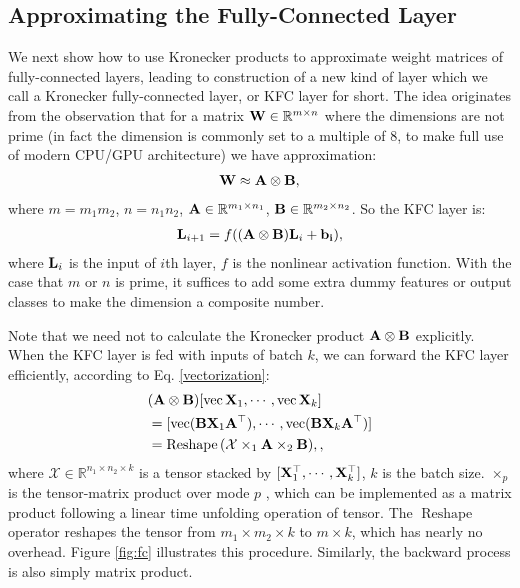 \documentclass{article}
\def\A{{\bf A}}
\def\B{{\bf B}}
\def\L{{\bf L}}
\def\W{{\bf W}}
\def\X{{\bf X}}
\def\XM{{\mathcal X}}
\def\RB{{\mathbb R}}
\def\vect{\operatorname{vec}}
\begin{document}
\subsection{Approximating the Fully-Connected Layer}
We next show how to use Kronecker products to approximate weight matrices of fully-connected layers, leading to construction of a new kind of layer
which we call a Kronecker fully-connected layer, or KFC layer for short. The idea originates from the observation that for a matrix $\W\in\RB^{m\times
  n}$ where the dimensions are not prime (in fact the dimension is commonly set to a multiple of 8, to make full use of modern CPU/GPU architecture)
we have approximation:
\begin{align}
\label{composition}
\W \approx \A \otimes \B,
\end{align}
where $m = m_1 m_2$, $n = n_1 n_2$, $\A\in \RB^{m_1\times n_1}$, $\B\in
\RB^{m_2\times n_2}$.
So the KFC layer is:
\begin{align}
\L_{i+1} = f((\A \otimes \B) \L_{i} + \bf{b}_i),
\end{align}
where $\L_i$ is the input of $i$th layer, $f$ is the nonlinear activation function.
With the case that $m$ or $n$ is prime, it suffices to add some extra dummy features or output classes to make the dimension a composite number.

Note that we need not to calculate the Kronecker product $\A \otimes \B$ explicitly.
When the KFC layer is fed with inputs of batch $k$, we can forward the KFC layer efficiently, according to Eq. \eqref{vectorization}:
\begin{align}
\label{kp-tensor-calc}
\begin{split}
& (\A \otimes \B) [\vect{\X}_1, \cdots, \vect{\X}_k] \\
& =   [\vect
(\B \X_1 \A^\top), \cdots,
\vect(\B \X_k \A^\top)] \\
&=  \operatorname{Reshape}{(\XM \times_1 \A \times_2 \B)},
,
\end{split}
\end{align}
where $\XM \in\RB^{n_1\times n_2\times k}$ is a tensor stacked by $[\X_1^\top,\cdots,\X_k^\top]$, $k$ is the batch size. $\times_p$ is the tensor-matrix product over mode $p$ \cite{Kolda:2009:TDA:1655228.1655230}, which can be implemented as a matrix product following a linear time unfolding operation of tensor. The $\operatorname{Reshape}$ operator reshapes the tensor from $m_1 \times m_2 \times k$ to $m \times k$, which has nearly no overhead. Figure \ref{fig:fc} illustrates this procedure.
Similarly, the backward process is also simply matrix product.
\end{document}
